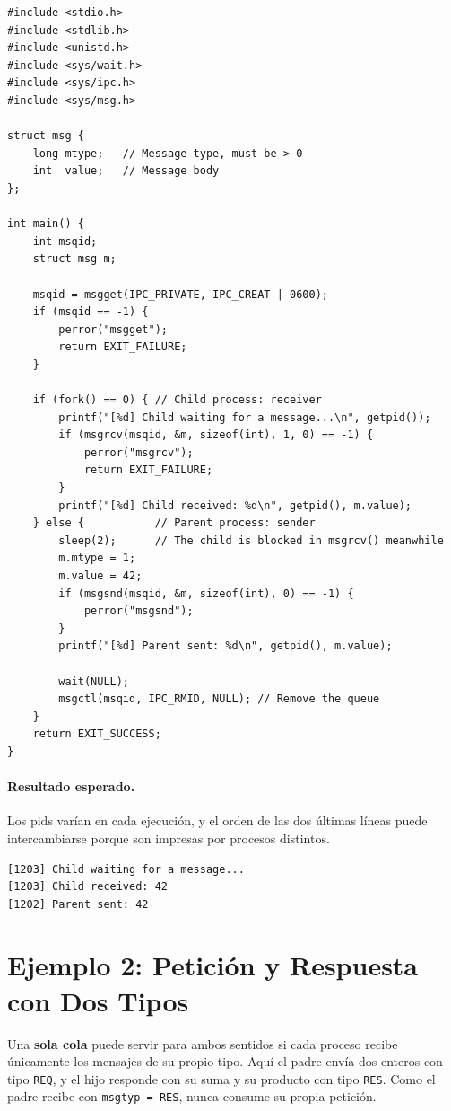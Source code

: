 \documentclass[12pt,a4paper]{article}
\begin{document}
\begin{lstlisting}
#include <stdio.h>
#include <stdlib.h>
#include <unistd.h>
#include <sys/wait.h>
#include <sys/ipc.h>
#include <sys/msg.h>

struct msg {
    long mtype;   // Message type, must be > 0
    int  value;   // Message body
};

int main() {
    int msqid;
    struct msg m;

    msqid = msgget(IPC_PRIVATE, IPC_CREAT | 0600);
    if (msqid == -1) {
        perror("msgget");
        return EXIT_FAILURE;
    }

    if (fork() == 0) { // Child process: receiver
        printf("[%d] Child waiting for a message...\n", getpid());
        if (msgrcv(msqid, &m, sizeof(int), 1, 0) == -1) {
            perror("msgrcv");
            return EXIT_FAILURE;
        }
        printf("[%d] Child received: %d\n", getpid(), m.value);
    } else {           // Parent process: sender
        sleep(2);      // The child is blocked in msgrcv() meanwhile
        m.mtype = 1;
        m.value = 42;
        if (msgsnd(msqid, &m, sizeof(int), 0) == -1) {
            perror("msgsnd");
        }
        printf("[%d] Parent sent: %d\n", getpid(), m.value);

        wait(NULL);
        msgctl(msqid, IPC_RMID, NULL); // Remove the queue
    }
    return EXIT_SUCCESS;
}
\end{lstlisting}

\paragraph{Resultado esperado.} Los pids varían en cada ejecución, y el orden de las dos últimas líneas puede intercambiarse porque son impresas por procesos distintos.
\begin{lstlisting}[language={}, numbers=none]
[1203] Child waiting for a message...
[1203] Child received: 42
[1202] Parent sent: 42
\end{lstlisting}

\section{Ejemplo 2: Petición y Respuesta con Dos Tipos}
Una \textbf{sola cola} puede servir para ambos sentidos si cada proceso recibe únicamente los mensajes de su propio tipo. Aquí el padre envía dos enteros con tipo \texttt{REQ}, y el hijo responde con su suma y su producto con tipo \texttt{RES}. Como el padre recibe con \texttt{msgtyp = RES}, nunca consume su propia petición.
\end{document}
